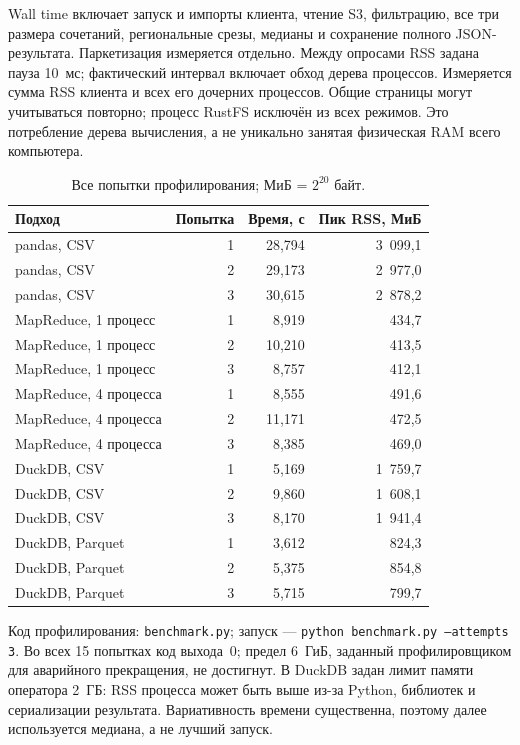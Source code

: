 \documentclass[11pt,a4paper]{article}
\begin{document}
Wall time включает запуск и импорты клиента, чтение S3, фильтрацию, все три размера сочетаний, региональные срезы, медианы и сохранение полного JSON-результата. Паркетизация измеряется отдельно. Между опросами RSS задана пауза 10~мс; фактический интервал включает обход дерева процессов. Измеряется сумма RSS клиента и всех его дочерних процессов. Общие страницы могут учитываться повторно; процесс RustFS исключён из всех режимов. Это потребление дерева вычисления, а не уникально занятая физическая RAM всего компьютера.
\begin{table}[h!]
\centering\small
\caption{Все попытки профилирования; МиБ = $2^{20}$ байт.}
\begin{tabularx}{\linewidth}{Xrrr}\toprule
Подход & Попытка & Время, с & Пик RSS, МиБ\\\midrule
pandas, CSV & 1 & 28,794 & 3~099,1\\
pandas, CSV & 2 & 29,173 & 2~977,0\\
pandas, CSV & 3 & 30,615 & 2~878,2\\
MapReduce, 1 процесс & 1 & 8,919 & 434,7\\
MapReduce, 1 процесс & 2 & 10,210 & 413,5\\
MapReduce, 1 процесс & 3 & 8,757 & 412,1\\
MapReduce, 4 процесса & 1 & 8,555 & 491,6\\
MapReduce, 4 процесса & 2 & 11,171 & 472,5\\
MapReduce, 4 процесса & 3 & 8,385 & 469,0\\
DuckDB, CSV & 1 & 5,169 & 1~759,7\\
DuckDB, CSV & 2 & 9,860 & 1~608,1\\
DuckDB, CSV & 3 & 8,170 & 1~941,4\\
DuckDB, Parquet & 1 & 3,612 & 824,3\\
DuckDB, Parquet & 2 & 5,375 & 854,8\\
DuckDB, Parquet & 3 & 5,715 & 799,7\\
\bottomrule\end{tabularx}
\end{table}

Код профилирования: \texttt{benchmark.py}; запуск --- \texttt{python benchmark.py --attempts 3}. Во всех 15 попытках код выхода~0; предел 6~ГиБ, заданный профилировщиком для аварийного прекращения, не достигнут. В DuckDB задан лимит памяти оператора 2~ГБ: RSS процесса может быть выше из-за Python, библиотек и сериализации результата. Вариативность времени существенна, поэтому далее используется медиана, а не лучший запуск.
\end{document}

